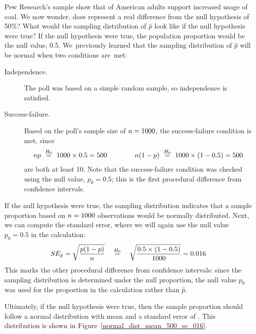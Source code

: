 \begin{examplewrap}
\begin{nexample}{Pew Research's sample show that
    \pewcoalpollpercent{}
    of American adults support increased usage of coal.
    We now wonder, does \pewcoalpollpercent{} represent
    a real difference from the null hypothesis of 50\%?
    What would the sampling distribution of $\hat{p}$
    look like if the null hypothesis were true?}
  If the null hypothesis were true, the population proportion
  would be the null value, 0.5.
  We~previously learned that
  the sampling distribution of $\hat{p}$ will be normal when
  two conditions are~met:
  \begin{description}
    \item[Independence.]
        The poll was based on a simple random sample,
        so independence is satisfied.
    \item[Success-failure.]
        Based on the poll's sample size of
        $n = 1000{}$,
        the success-failure condition is met, since
        \begin{align*}
        np ~ \stackrel{H_0}{=}
            ~ 1000{} \times 0.5{}
            = 500
        \qquad\qquad
        n (1 - p) ~ \stackrel{H_0}{=}
            ~ 1000{} \times
                (1 - 0.5{})
            = 500
        \end{align*}
        are both at least 10.
        Note that the success-failure condition was checked
        using the null value, $p_0 = 0.5$;
        this is the first procedural difference from
        confidence intervals.
  \end{description}
  If the null hypothesis were true, the sampling distribution
  indicates that a sample proportion based on
  $n = 1000{}$ observations
  would be normally distributed. Next, we can compute the standard
  error, where we will again use the null value $p_0 = 0.5$ in the
  calculation:
  \begin{align*}
  SE_{\hat{p}}
    = \sqrt{\frac{p (1 - p)}{n}}
    \quad \stackrel{H_0}{=} \quad
        \sqrt{\frac{0.5{} \times
            (1 - 0.5{})}{1000{}}}
    = 0.016{}
  \end{align*}
  This marks the other procedural difference from confidence
  intervals: since the sampling distribution is determined
  under the null proportion, the null value $p_0$ was used for
  the proportion in the calculation rather than $\hat{p}$.

  Ultimately, if the null hypothesis were true, then the sample
  proportion should follow a normal distribution with mean
  \pewcoalpollnullvalue{}
  and a standard error of \pewcoalpollnullse{}.
  This distribution is shown in
  Figure~\ref{normal_dist_mean_500_se_016}.
\end{nexample}
\end{examplewrap}

